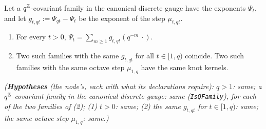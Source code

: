 \begin{lemma}
\label{lem:step-field-determines-family}
\leanok
{}
Let a $q^{\mathbb{Z}}$-covariant family in the canonical discrete gauge have the exponents $\Psi_t$, and
let $g_{t,qt} := \Psi_{qt} - \Psi_t$ be the exponent of the step $\mu_{t,qt}$.
\begin{enumerate}
\item For every $t > 0$, $\Psi_t = \sum_{m \ge 1}g_{t,qt}(q^{-m}\,\cdot)$.
\item Two such families with the same $g_{t,qt}$ for all $t \in [1,q)$ coincide. Two such families
with the same octave step $\mu_{1,q}$ have the same knot kernels.
\end{enumerate}
\statusT\quad\emph{(\textbf{Hypotheses} (the node's, each with what its declarations require): $q > 1$:
same; a $q^{\mathbb{Z}}$-covariant family in the canonical discrete gauge: same (\texttt{IsQFamily}), for
each of the two families of (2); (1) $t > 0$: same; (2) the same $g_{t,qt}$ for $t \in [1,q)$:
same; the same octave step $\mu_{1,q}$: same.)}
\end{lemma}

